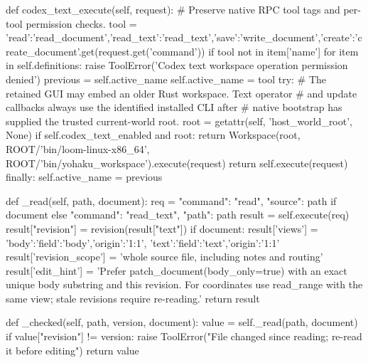     def codex_text_execute(self, request):
        # Preserve native RPC tool tags and per-tool permission checks.
        tool = {'read':'read_document','read_text':'read_text','save':'write_document','create':'create_document'}.get(request.get('command'))
        if tool not in {item['name'] for item in self.definitions}:
            raise ToolError('Codex text workspace operation permission denied')
        previous = self.active_name
        self.active_name = tool
        try:
            # The retained GUI may embed an older Rust workspace. Text operator
            # and update callbacks always use the identified installed CLI after
            # native bootstrap has supplied the trusted current-world root.
            root = getattr(self, 'host_world_root', None)
            if self.codex_text_enabled and root:
                return Workspace(root, ROOT/'bin/loom-linux-x86_64', ROOT/'bin/yohaku_workspace').execute(request)
            return self.execute(request)
        finally: self.active_name = previous

    def _read(self, path, document):
        req = {"command": "read", "source": path} if document else {"command": "read_text", "path": path}
        result = self.execute(req)
        result["revision"] = revision(result["text"])
        if document:
            result['views'] = {'body':{'field':'body','origin':'1:1'},
                               'text':{'field':'text','origin':'1:1'}}
            result['revision_scope'] = 'whole source file, including notes and routing'
            result['edit_hint'] = 'Prefer patch_document(body_only=true) with an exact unique body substring and this revision. For coordinates use read_range with the same view; stale revisions require re-reading.'
        return result

    def _checked(self, path, version, document):
        value = self._read(path, document)
        if value["revision"] != version:
            raise ToolError("File changed since reading; re-read it before editing")
        return value

